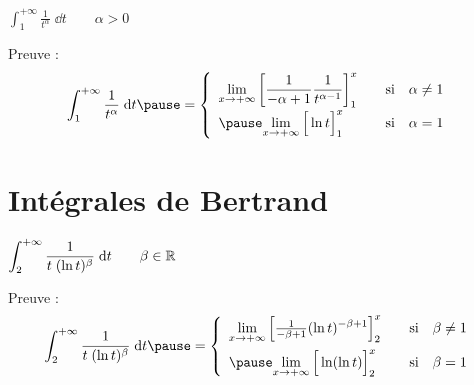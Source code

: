 \begin{frame}

\smallskip
 
 \qquad $\displaystyle
\int_1^{+\infty} \frac{1}{t^{\alpha}}\;\dd t\qquad \alpha>0$

\pause
{}

\pause
Preuve :
$$
\int_1^{+\infty} \frac{1}{t^{\alpha}}\;\dd t 
\pause = 
\left\{
\begin{array}{lcl}
\displaystyle{\lim_{x\rightarrow+\infty} 
\left[\frac{1}{-\alpha+1}\frac{1}{t^{\alpha-1}}\right]_1^x}
&\quad\text{si}&\alpha\neq 1\\[2ex]
\pause
\displaystyle{\lim_{x\rightarrow+\infty} 
\Big[\ln t\Big]_1^x}
&\quad\text{si}&\alpha= 1
\end{array}
\right.
$$



\end{frame}


\section*{Intégrales de Bertrand}

\begin{frame}

\smallskip

\qquad
$\displaystyle \int_2^{+\infty} \frac{1}{t\;(\ln t)^{\beta}}\;\text{d} t \qquad \beta \in \mathbb{R}$

\pause
{}
\pause
Preuve :
$$
\int_2^{+\infty} \frac{1}{t\;(\ln t)^{\beta}}\;\dd t 
\pause= 
\left\{
\begin{array}{lcl}
\displaystyle{\lim_{x\rightarrow+\infty} 
\Big[\tfrac{1}{-\beta+1}(\ln t)^{-\beta+1}\Big]_2^x}
&\quad\text{si}&\beta\neq 1\\[2ex]
\pause
\displaystyle{\lim_{x\rightarrow+\infty} 
\Big[\ln(\ln t)\Big]_2^x}
&\quad\text{si}&\beta= 1
\end{array}
\right.
$$

\end{frame}



